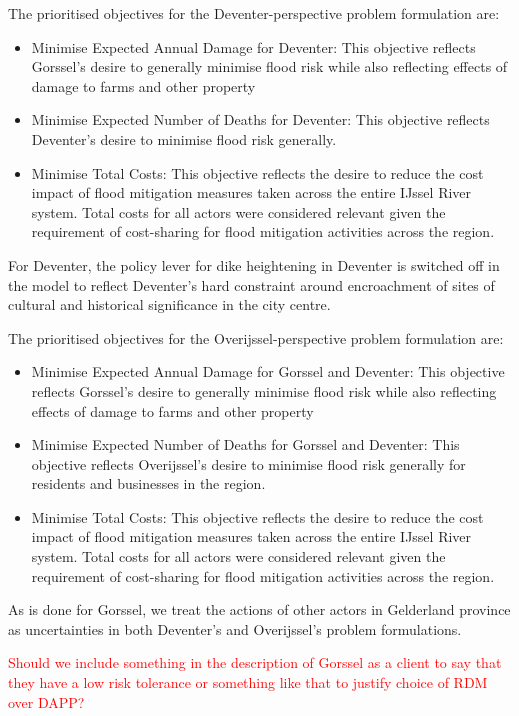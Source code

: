 \smallskip  

The prioritised objectives for the Deventer-perspective problem formulation are:
\begin{itemize}
    \item Minimise Expected Annual Damage for Deventer: This objective reflects Gorssel's desire to generally minimise flood risk while also reflecting effects of damage to farms and other property
    \item Minimise Expected Number of Deaths for Deventer: This objective reflects Deventer's desire to minimise flood risk generally.
    \item Minimise Total Costs: This objective reflects the desire to reduce the cost impact of flood mitigation measures taken across the entire IJssel River system. Total costs for all actors were considered relevant given the requirement of cost-sharing for flood mitigation activities across the region.
\end{itemize}
For Deventer, the policy lever for dike heightening in Deventer is switched off in the model to reflect Deventer's hard constraint around encroachment of sites of cultural and historical significance in the city centre.

The prioritised objectives for the Overijssel-perspective problem formulation are:
\begin{itemize}
    \item Minimise Expected Annual Damage for Gorssel and Deventer: This objective reflects Gorssel's desire to generally minimise flood risk while also reflecting effects of damage to farms and other property
    \item Minimise Expected Number of Deaths for Gorssel and Deventer: This objective reflects Overijssel's desire to minimise flood risk generally for residents and businesses in the region.
    \item Minimise Total Costs: This objective reflects the desire to reduce the cost impact of flood mitigation measures taken across the entire IJssel River system. Total costs for all actors were considered relevant given the requirement of cost-sharing for flood mitigation activities across the region.
\end{itemize}

As is done for Gorssel, we treat the actions of other actors in Gelderland province as uncertainties in both Deventer's and Overijssel's problem formulations.

\textcolor{red}{Should we include something in the description of Gorssel as a client to say that they have a low risk tolerance or something like that to justify choice of RDM over DAPP?}